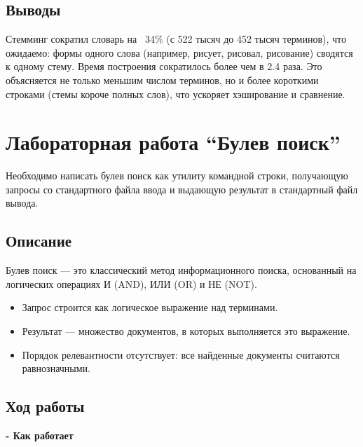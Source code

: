 \documentclass[pdf, unicode, 12pt, a4paper, oneside, fleqn]{article}
\begin{document}
\subsection*{Выводы}
Стемминг сократил словарь на ~34\% (с 522 тысяч до 452 тысяч терминов), что ожидаемо: формы одного слова (например, рисует, рисовал, рисование) сводятся к одному стему. Время построения сократилось более чем в 2.4 раза. Это объясняется не только меньшим числом терминов, но и более короткими строками (стемы короче полных слов), что ускоряет хэширование и сравнение.

\pagebreak

\section{Лабораторная работа  \enquote{Булев поиск}}

Необходимо написать булев поиск как утилиту командной строки, получающую запросы со стандартного файла ввода и выдающую результат в стандартный файл вывода.

\subsection*{Описание}
Булев поиск — это классический метод информационного поиска, основанный на логических операциях И (AND), ИЛИ (OR) и НЕ (NOT).
\begin{itemize}
    \item Запрос строится как логическое выражение над терминами.
    \item Результат — множество документов, в которых выполняется это выражение.
    \item Порядок релевантности отсутствует: все найденные документы считаются равнозначными.
\end{itemize}

\subsection*{Ход работы}

\textbf{- Как работает}
\end{document}
